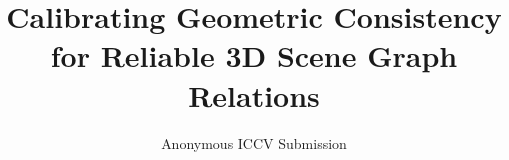 \documentclass[10pt,twocolumn,letterpaper]{article}
\title{Calibrating Geometric Consistency for Reliable 3D Scene Graph Relations}
\author{Anonymous ICCV Submission}
\begin{document}
\maketitle











{
    \small
    
    
}
\end{document}
